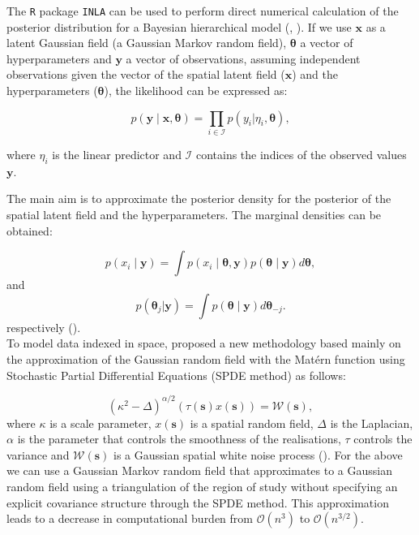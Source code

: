 \documentclass{article}
\begin{document}
\vspace{0.2cm}


The \texttt{R} package \texttt{INLA} can be used to perform direct numerical calculation of the posterior distribution for a Bayesian hierarchical model (\cite{rue2009approximate}, \cite{martino2009implementing}). If we use $\boldsymbol{x}$ as a latent Gaussian field (a Gaussian Markov random field), $\boldsymbol{\theta}$ a vector of hyperparameters and $\boldsymbol{y}$ a vector of observations, assuming independent observations given the vector of the spatial latent field ($\boldsymbol{x}$) and the hyperparameters ($\boldsymbol{\theta}$), the likelihood can be expressed as:

\begin{equation} \label{eqn:eq6}
p(\boldsymbol{y}\mid \boldsymbol{x},\boldsymbol{\theta}) =\prod_{i\in \mathcal{I}} p(y_i|\eta_i,\boldsymbol{\theta}),
\end{equation}

where $\eta_{i}$ is the linear predictor and $\mathcal{I}$ contains the indices of the observed values $\boldsymbol{y}$.  

The main aim is to approximate the posterior density for the posterior of the spatial latent field and the hyperparameters. The marginal densities can be obtained:

\begin{equation} \label{eqn:eq7}
p(x_i \mid \boldsymbol{y}) = \int p(x_i \mid \boldsymbol{\theta},\boldsymbol{y})  p(\boldsymbol{\theta} \mid \boldsymbol{y}) d\boldsymbol{\theta},
\end{equation}
and
\begin{equation} \label{eqn:eq8}
p(\boldsymbol{\theta}_j|\boldsymbol{y}) = \int p(\boldsymbol{\theta} \mid \boldsymbol{y})  d\boldsymbol{\theta}_{-j}.
\end{equation}
respectively (\cite{lindgren2015bayesian, krainski2018advanced}). \\


To model data indexed in space, \cite{lindgren2011explicit} proposed a new methodology based mainly on the approximation of the Gaussian random field with the Mat\'ern function using  Stochastic Partial Differential Equations (SPDE method) as follows:

\begin{equation}\label{eqn:eq9}
(\kappa^{2} - \Delta)^{\alpha/2}(\tau(\boldsymbol{s}) x(\boldsymbol{s})) = \boldsymbol{\mathcal{W}(s)},
\end{equation}
where $\kappa$ is a scale parameter, $x(\boldsymbol{s})$ is a spatial random field, $\Delta$ is the Laplacian, $\alpha$ is the parameter that controls the smoothness of the realisations, $\tau$ controls the variance and $\boldsymbol{\mathcal{W}(s)}$  is a Gaussian spatial white noise process (\cite{lindgren2015bayesian}). For the above we can use a Gaussian Markov random field that approximates to a Gaussian random field using a triangulation of the region of study without specifying an explicit covariance structure through the SPDE method. This approximation leads to a decrease in computational burden from $\mathcal{O}(n^{3})$ to $\mathcal{O}(n^{3/2})$. 
\end{document}

